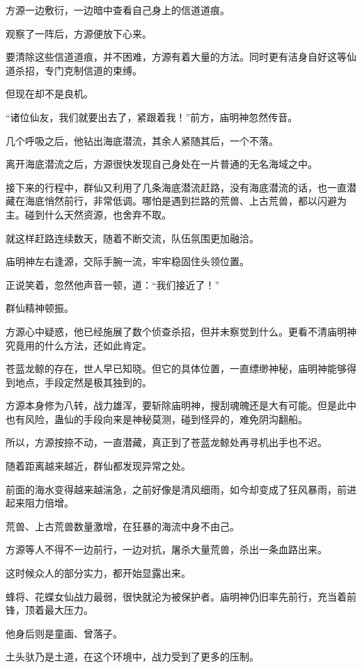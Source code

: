 \begin{this_body}
方源一边敷衍，一边暗中查看自己身上的信道道痕。

观察了一阵后，方源便放下心来。

要清除这些信道道痕，并不困难，方源有着大量的方法。同时更有洁身自好这等仙道杀招，专门克制信道的束缚。

但现在却不是良机。

“诸位仙友，我们就要出去了，紧跟着我！”前方，庙明神忽然传音。

几个呼吸之后，他钻出海底潜流，其余人紧随其后，一个不落。

离开海底潜流之后，方源很快发现自己身处在一片普通的无名海域之中。

接下来的行程中，群仙又利用了几条海底潜流赶路，没有海底潜流的话，也一直潜藏在海底悄然前行，非常低调。哪怕是遇到拦路的荒兽、上古荒兽，都以闪避为主。碰到什么天然资源，也舍弃不取。

就这样赶路连续数天，随着不断交流，队伍氛围更加融洽。

庙明神左右逢源，交际手腕一流，牢牢稳固住头领位置。

正说笑着，忽然他声音一顿，道：“我们接近了！”

群仙精神顿振。

方源心中疑惑，他已经施展了数个侦查杀招，但并未察觉到什么。更看不清庙明神究竟用的什么方法，还如此肯定。

苍蓝龙鲸的存在，世人早已知晓。但它的具体位置，一直缥缈神秘，庙明神能够得到地点，手段定然是极其独到的。

方源本身修为八转，战力雄浑，要斩除庙明神，搜刮魂魄还是大有可能。但是此中也有风险，蛊仙的手段向来是神秘莫测，碰到怪异的，难免阴沟翻船。

所以，方源按捺不动，一直潜藏，真正到了苍蓝龙鲸处再寻机出手也不迟。

随着距离越来越近，群仙都发现异常之处。

前面的海水变得越来越湍急，之前好像是清风细雨，如今却变成了狂风暴雨，前进起来阻力倍增。

荒兽、上古荒兽数量激增，在狂暴的海流中身不由己。

方源等人不得不一边前行，一边对抗，屠杀大量荒兽，杀出一条血路出来。

这时候众人的部分实力，都开始显露出来。

蜂将、花蝶女仙战力最弱，很快就沦为被保护者。庙明神仍旧率先前行，充当着前锋，顶着最大压力。

他身后则是童画、曾落子。

土头驮乃是土道，在这个环境中，战力受到了更多的压制。


\end{this_body}
